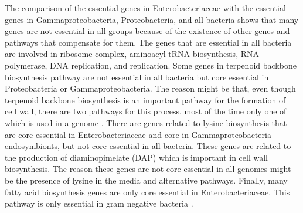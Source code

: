 \documentclass[12pt,letterpaper]{article}
\begin{document}
The comparison of the essential genes in Enterobacteriaceae with the essential genes in Gammaproteobacteria, Proteobacteria, and all bacteria shows that many genes are not essential in all groups because of the existence of other genes and pathways that compensate for them. The genes that are essential in all bacteria are involved in ribosome complex, aminoacyl-tRNA biosynthesis, RNA polymerase, DNA replication, and replication. Some genes in terpenoid backbone biosynthesis pathway are not essential in all bacteria but core essential in Proteobacteria or Gammaproteobacteria. The reason might be that, even though terpenoid backbone biosynthesis is an important pathway for the formation of cell wall, there are two pathways for this process, most of the time only one of which is used in a genome \cite{heuston_isoprenoid_2012}. There are genes related to lysine biosynthesis that are core essential in Enterobacteriaceae and core in Gammaproteobacteria endosymbionts, but not core essential in all bacteria. These genes are related to the production of diaminopimelate (DAP) which is important in cell wall biosynthesis. The reason these genes are not core essential in all genomes might be the presence of lysine in the media and alternative pathways. Finally, many fatty acid biosynthesis genes are only core essential in Enterobacteriaceae. This pathway is only essential in gram negative bacteria \cite{parsons_identification_2014, parsons_incorporation_2014}.
\end{document}

